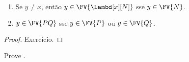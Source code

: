 \documentclass[../../../include/open-logic-section]{subfiles}
\begin{document}
\begin{lem}
  \begin{enumerate}
    \item {} Se $y \neq x$, então $y \in
      \FV{\lambd[x][N]}$ sse $y \in \FV{N}$.
    \item {} $y \in \FV{PQ}$ sse $y \in \FV{P}$ ou $y
      \in \FV{Q}$.
    \end{enumerate}
\end{lem}

\begin{proof}
  Exercício.
\end{proof}

\begin{prob}
  Prove .
\end{prob}
\end{document}

